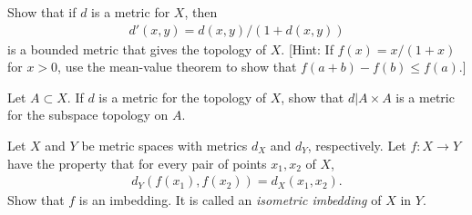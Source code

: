   \begin{exercise}[Munkres 20.11]
    Show that if $d$ is a metric for $X$, then
    \begin{align*}
      d'(x, y) = d(x, y)/(1 + d(x, y))
    \end{align*}
    is a bounded metric that gives the topology of $X$. [Hint: If $f(x) = x/(1 + x)$ for $x > 0$, use the mean-value theorem to show that $f(a + b) - f(b) \leq f(a)$.]
  \end{exercise}

  \begin{exercise}[Munkres 21.1]
    Let $A \subset X$. If $d$ is a metric for the topology of $X$, show that $d|A \times A$ is a metric for the subspace topology on $A$.
  \end{exercise}

  \begin{exercise}[Munkres 21.2]
    Let $X$ and $Y$ be metric spaces with metrics $d_X$ and $d_Y$, respectively. Let $f : X \to Y$ have the property that for every pair of points $x_1, x_2$ of $X$,
    \begin{align*}
      d_Y(f(x_1), f(x_2)) = d_X(x_1, x_2).
    \end{align*}
    Show that $f$ is an imbedding. It is called an \textit{isometric imbedding} of $X$ in $Y$.
  \end{exercise}

